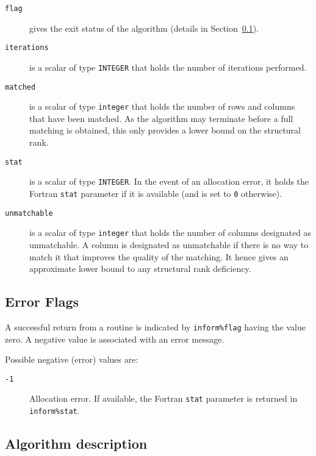 \begin{description}

\item[\texttt{flag}] gives the exit status of the algorithm (details in Section~\ref{returns:auction}).

\item[\texttt{iterations}] is a scalar of type \texttt{INTEGER} that holds the number of iterations performed.

\item[\texttt{matched}] is a scalar of type \texttt{integer} that holds the number of rows and columns that have been matched. As the algorithm may terminate before a full matching is obtained, this only provides a lower bound on the structural rank.

\item[\texttt{stat}] is a scalar of type \texttt{INTEGER}. In the event of an allocation error, it holds the Fortran \texttt{stat} parameter if it is available (and is set to \texttt{0} otherwise).

\item[\texttt{unmatchable}] is a scalar of type \texttt{integer} that holds the number of columns designated as unmatchable. A column is designated as unmatchable if there is no way to match it that improves the quality of the matching. It hence gives an approximate lower bound to any structural rank deficiency.

\end{description}

\subsection{Error Flags} \label{returns:auction}
A successful return from a routine is indicated by \texttt{inform\%flag} having the value zero. A negative value is associated with an error message.

Possible negative (error) values are:
\begin{description}
\item[\texttt{-1}] Allocation error. If available, the Fortran \texttt{stat} parameter is returned in \texttt{inform\%stat}.
\end{description}

\subsection{Algorithm description} \label{method:auction}

